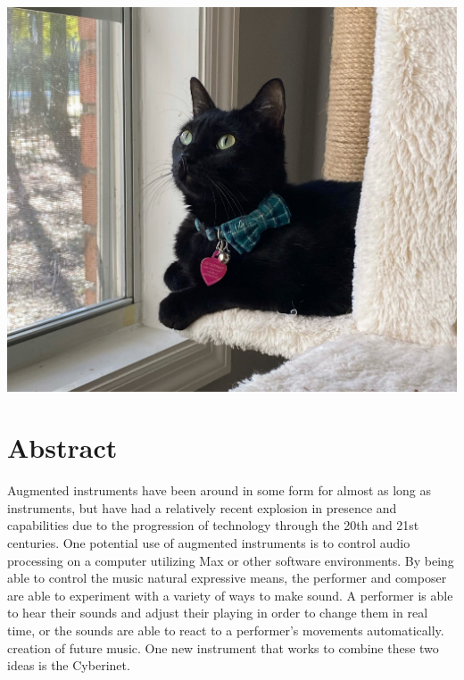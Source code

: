 \vspace{25mm}
\begin{center}
    \includegraphics[scale=0.2]{bean.jpeg}
\end{center}

\tableofcontents

 \listoffigures

\chapter{Abstract}


Augmented instruments have been around in some form for almost as long as instruments, but have had a relatively recent explosion in presence and capabilities due to the progression of technology through the 20th and 21st centuries. One potential use of augmented instruments is to control audio processing on a computer utilizing Max or other software environments. By being able to control the music natural expressive means, the performer and composer are able to experiment with a variety of ways to make sound. A performer is able to hear their sounds and adjust their playing in order to change them in real time, or the sounds are able to react to a performer's movements automatically. creation of future music. One new instrument that works to combine these two ideas is the Cyberinet.


